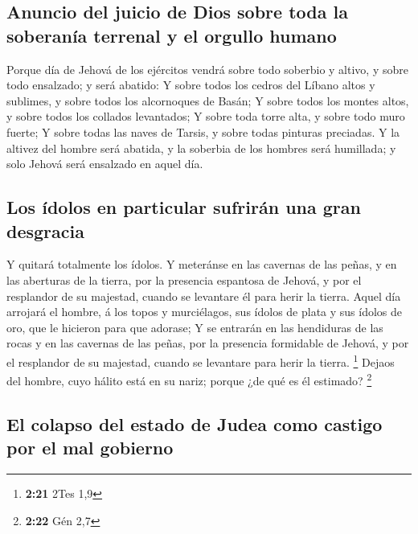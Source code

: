 \hypertarget{anuncio-del-juicio-de-dios-sobre-toda-la-soberanuxeda-terrenal-y-el-orgullo-humano}{%
\subsection{Anuncio del juicio de Dios sobre toda la soberanía terrenal
y el orgullo
humano}\label{anuncio-del-juicio-de-dios-sobre-toda-la-soberanuxeda-terrenal-y-el-orgullo-humano}}

 Porque día de Jehová de los ejércitos vendrá sobre todo
soberbio y altivo, y sobre todo ensalzado; y será abatido: 
Y sobre todos los cedros del Líbano altos y sublimes, y sobre todos los
alcornoques de Basán;  Y sobre todos los montes altos, y
sobre todos los collados levantados;  Y sobre toda torre
alta, y sobre todo muro fuerte;  Y sobre todas las naves de
Tarsis, y sobre todas pinturas preciadas.  Y la altivez del
hombre será abatida, y la soberbia de los hombres será humillada; y solo
Jehová será ensalzado en aquel día.

\hypertarget{los-uxeddolos-en-particular-sufriruxe1n-una-gran-desgracia}{%
\subsection{Los ídolos en particular sufrirán una gran
desgracia}\label{los-uxeddolos-en-particular-sufriruxe1n-una-gran-desgracia}}

 Y quitará totalmente los ídolos.  Y meteránse
en las cavernas de las peñas, y en las aberturas de la tierra, por la
presencia espantosa de Jehová, y por el resplandor de su majestad,
cuando se levantare él para herir la tierra.  Aquel día
arrojará el hombre, á los topos y murciélagos, sus ídolos de plata y sus
ídolos de oro, que le hicieron para que adorase;  Y se
entrarán en las hendiduras de las rocas y en las cavernas de las peñas,
por la presencia formidable de Jehová, y por el resplandor de su
majestad, cuando se levantare para herir la tierra. \footnote{\textbf{2:21}
  2Tes 1,9}  Dejaos del hombre, cuyo hálito está en su
nariz; porque ¿de qué es él estimado? \footnote{\textbf{2:22} Gén 2,7}

\hypertarget{el-colapso-del-estado-de-judea-como-castigo-por-el-mal-gobierno}{%
\subsection{El colapso del estado de Judea como castigo por el mal
gobierno}\label{el-colapso-del-estado-de-judea-como-castigo-por-el-mal-gobierno}}

